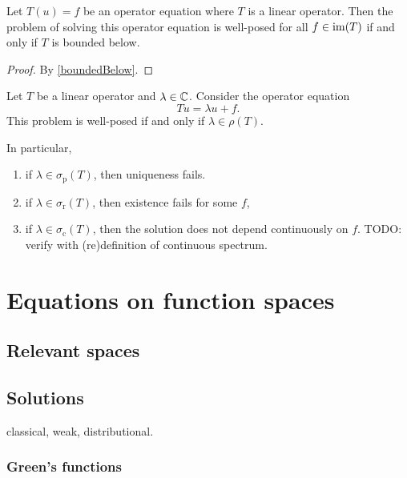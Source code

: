\begin{proposition}
Let $ T(u) = f$ be an operator equation where $T$ is a linear operator. Then the problem of solving this operator equation is well-posed for all $f\in\operatorname{im}(T)$ \textup{if and only if} $T$ is bounded below.
\end{proposition}
\begin{proof}
By \ref{boundedBelow}.
\end{proof}

\begin{proposition}
Let $T$ be a linear operator and $\lambda \in \mathbb{C}$. Consider the operator equation
\[  Tu = \lambda u + f. \]
This problem is well-posed if and only if $\lambda\in \rho(T)$.

In particular, 
\begin{enumerate}
\item if $\lambda\in\sigma_\text{p}(T)$, then uniqueness fails.
\item if $\lambda\in\sigma_\text{r}(T)$, then existence fails for some $f$,
\item if $\lambda\in\sigma_\text{c}(T)$, then the solution does not depend continuously on $f$. TODO: verify with (re)definition of continuous spectrum.
\end{enumerate}
\end{proposition}


\section{Equations on function spaces}
\subsection{Relevant spaces}

\subsection{Solutions}
classical, weak, distributional.

\subsubsection{Green's functions}


